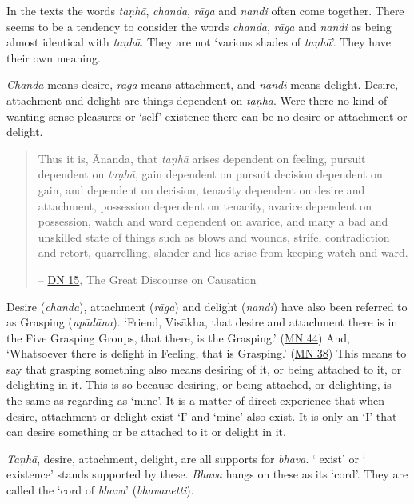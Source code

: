 In the texts the words \emph{taṇhā}, \emph{chanda}, \emph{rāga} and \emph{nandi} often come together. There seems to be a tendency to consider the words \emph{chanda}, \emph{rāga} and \emph{nandi} as being almost identical with \emph{taṇhā}. They are not `various shades of \emph{taṇhā}'. They have their own meaning.

\emph{Chanda} means desire, \emph{rāga} means attachment, and \emph{nandi} means delight. Desire, attachment and delight are things dependent on \emph{taṇhā}. Were there no kind of wanting sense-pleasures or `self'-existence there can be no desire or attachment or delight.

\begin{quote}
Thus it is, Ānanda, that \emph{taṇhā} arises dependent on feeling, pursuit dependent on \emph{taṇhā}, gain dependent on pursuit decision dependent on gain,  and  dependent on decision, tenacity dependent on desire and attachment, possession dependent on tenacity, avarice dependent on possession, watch and ward dependent on avarice, and many a bad and unskilled state of things such as blows and wounds, strife, contradiction and retort, quarrelling, slander and lies arise from keeping watch and ward.

 -- \href{https://suttacentral.net/dn15/en/bodhi}{DN 15}, The Great Discourse on Causation
\end{quote}

Desire (\emph{chanda}), attachment (\emph{rāga}) and delight (\emph{nandi}) have also been referred to as Grasping (\emph{upādāna}). `Friend, Visākha, that desire and attachment there is in the Five Grasping Groups, that there, is the Grasping.' (\href{https://suttacentral.net/mn44/en/sujato}{MN 44}) And, `Whatsoever there is delight in Feeling, that is Grasping.' (\href{https://suttacentral.net/mn38/en/bodhi}{MN 38}) This means to say that grasping something also means desiring of it, or being attached to it, or delighting in it. This is so because desiring, or being attached, or delighting, is  the same as regarding as `mine'. It is a matter of direct experience that when desire, attachment or delight exist `I' and `mine' also exist. It is only an `I' that can desire something or be attached to it or delight in it.

\emph{Taṇhā}, desire, attachment, delight, are all supports for \emph{bhava}. ` exist' or ` existence' stands supported by these. \emph{Bhava} hangs on these as its `cord'. They are called the `cord of \emph{bhava}' (\emph{bhavanetti}).

